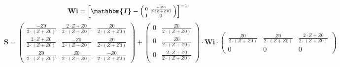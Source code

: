 \[ \mathbf{Wi} =  \left[ \boldsymbol{\mathbbm{I}}  -
\left(\begin{smallmatrix} 0 & \frac{-Z0}{2\cdot  (Z+Z0 )} \\ 1 & 0
\end{smallmatrix}\right) \right]^{-1}  \]
\[ \mathbf{S} = \left(\begin{smallmatrix} \frac{-Z0}{2\cdot  (Z+Z0 )}
& \frac{2\cdot Z+Z0}{2\cdot  (Z+Z0 )} & \frac{Z0}{2\cdot  (Z+Z0 )} \\
\frac{2\cdot Z+Z0}{2\cdot  (Z+Z0 )} & \frac{-Z0}{2\cdot  (Z+Z0 )} &
\frac{Z0}{2\cdot  (Z+Z0 )} \\ \frac{Z0}{2\cdot  (Z+Z0 )} &
\frac{Z0}{2\cdot  (Z+Z0 )} & \frac{-Z0}{2\cdot  (Z+Z0 )}
\end{smallmatrix}\right) + \left(\begin{smallmatrix} 0 &
\frac{Z0}{2\cdot  (Z+Z0 )} \\ 0 & \frac{Z0}{2\cdot  (Z+Z0 )} \\ 0 &
\frac{2\cdot Z+Z0}{2\cdot  (Z+Z0 )} \end{smallmatrix}\right) \cdot
\mathbf{Wi} \cdot\left(\begin{smallmatrix} \frac{Z0}{2\cdot  (Z+Z0 )}
& \frac{Z0}{2\cdot  (Z+Z0 )} & \frac{2\cdot Z+Z0}{2\cdot  (Z+Z0 )} \\
0 & 0 & 0 \end{smallmatrix}\right) \]
